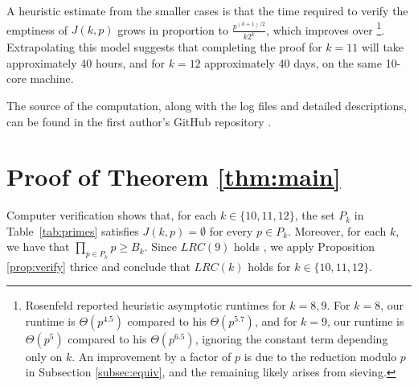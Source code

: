 \documentclass[11pt]{amsart}
\theoremstyle{definition}
\theoremstyle{remark}
\begin{document}
A heuristic estimate from the smaller cases is that the time required to verify the emptiness of $J(k, p)$ grows in proportion to $\frac{p^{(k+1)/2}}{k2^k}$, 
which improves over \cite{rosenfeld2025lonely2}\footnote{Rosenfeld \cite{rosenfeld2025lonely2} reported heuristic asymptotic runtimes for $k=8,9$. 
For $k=8$, our runtime is $\Theta(p^{4.5})$ compared to his $\Theta(p^{5.7})$, and for $k=9$, our runtime is $\Theta(p^5)$ compared to his $\Theta(p^{6.5})$, 
ignoring the constant term depending only on $k$. An improvement by a factor of $p$ is due to the reduction modulo $p$ in Subsection \ref{subsec:equiv}, 
and the remaining likely arises from sieving.}. Extrapolating this model suggests that completing the proof for $k=11$ will take approximately 40 hours, 
and for $k=12$ approximately 40 days, on the same 10-core machine.

The source of the computation, along with the log files and detailed descriptions, 
can be found in the first author's GitHub repository \cite{mycode}.

\section{Proof of Theorem \ref{thm:main}}
\label{sec:result}
Computer verification shows that, for each $k\in\{10,11,12\}$, the set $P_k$ in Table~\ref{tab:primes} satisfies
$J(k,p) = \emptyset$ for every $p\in P_k$. Moreover, for each $k$, we have that $\prod_{p \in P_k} p\geq B_k$. 
Since $LRC(9)$ holds \cite{Trakulthongchai},
we apply Proposition \ref{prop:verify} thrice and conclude that $LRC(k)$ holds for $k\in\{10,11,12\}$.
\end{document}
